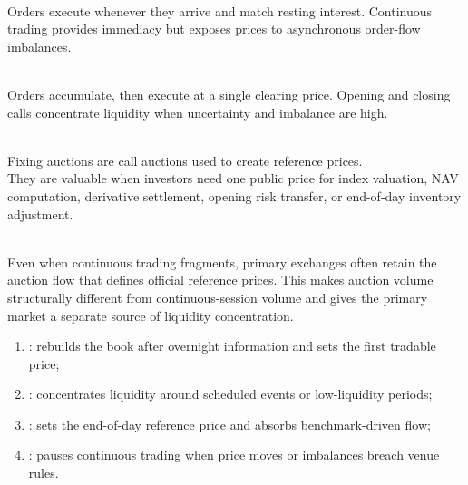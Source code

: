 \documentclass[a4paper,oneside,openany]{book}
\begin{document}
\begin{mechanism} \\
Orders execute whenever they arrive and match resting interest. Continuous trading provides immediacy but exposes prices to asynchronous order-flow imbalances.
\end{mechanism}

\begin{mechanism} \\
Orders accumulate, then execute at a single clearing price. Opening and closing calls concentrate liquidity when uncertainty and imbalance are high.
\end{mechanism}

\begin{mechanism} \\
Fixing auctions are call auctions used to create reference prices.\\
They are valuable when investors need one public price for index valuation, NAV computation, derivative settlement, opening risk transfer, or end-of-day inventory adjustment.
\end{mechanism}

\begin{principle} \\
Even when continuous trading fragments, primary exchanges often retain the auction flow that defines official reference prices. This makes auction volume structurally different from continuous-session volume and gives the primary market a separate source of liquidity concentration.
\end{principle}

\begin{taxonomy} 
\begin{enumerate}[label=\roman*.]
\setlength{\itemsep}{0pt}
\item {}: rebuilds the book after overnight information and sets the first tradable price;
\item {}: concentrates liquidity around scheduled events or low-liquidity periods;
\item {}: sets the end-of-day reference price and absorbs benchmark-driven flow;
\item {}: pauses continuous trading when price moves or imbalances breach venue rules.
\end{enumerate}
\end{taxonomy}
\end{document}
